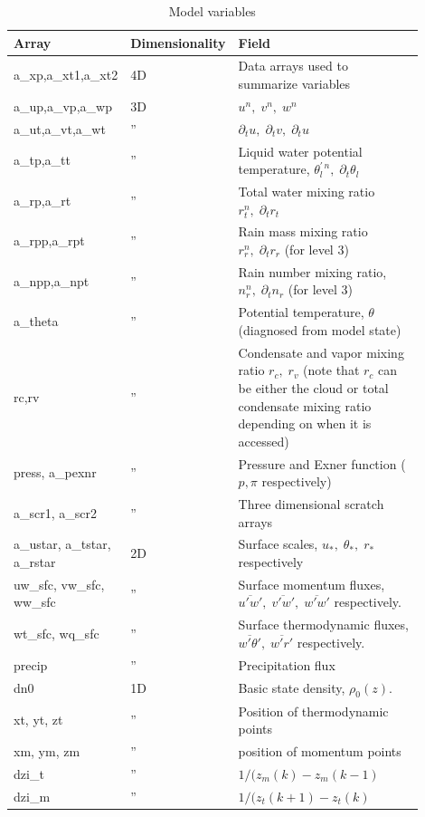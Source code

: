 \documentclass[11pt,a4paper]{article}
\begin{document}
\begin{longtable}[htb]{p{0.15\linewidth}p{0.15\linewidth}p{0.6\linewidth}}
\caption{Model variables} \label{tbl:variables}
\\ \hline \hline 
Array    & Dimensionality & Field \\ \hline \endhead
a\_xp,a\_xt1,a\_xt2 & 4D    & Data arrays used to summarize variables\\
a\_up,a\_vp,a\_wp & 3D    & $u^n, \; v^n, \;w^n$ \\
a\_ut,a\_vt,a\_wt & ''    & $\partial_t u, \; \partial_t v, 
\; \partial_t u$ \\  
a\_tp,a\_tt  & ''         & Liquid water potential temperature,
$\theta_l^{'\, n}, \;  \partial_t \theta_l$ \\ 
a\_rp,a\_rt  & ''         & Total water mixing ratio $r_t^n, \;
\partial_t r_t$ \\ 
a\_rpp,a\_rpt  & ''       & Rain mass mixing ratio $r_r^n, \;
\partial_t r_r$   (for level 3)\\  
a\_npp,a\_npt  & ''       & Rain number mixing ratio, $n_r^n, \;
\partial_t n_r$ (for level 3) \\  
a\_theta & '' & Potential temperature, $\theta$ (diagnosed from model state)\\  
rc,rv  & ''         & Condensate and vapor mixing ratio $r_c, \;
r_v$ (note that $r_c$ can be either the cloud or total condensate
mixing ratio depending on when it is accessed) \\ 
press, a\_pexnr & ''   & Pressure and Exner function ($p, \pi$ respectively)  \\  
a\_scr1, a\_scr2 & '' & Three dimensional scratch arrays \\
a\_ustar, a\_tstar, a\_rstar & 2D & Surface scales, $u_*, \;
\theta_*, \; r_*$ respectively \\ 
uw\_sfc, vw\_sfc, ww\_sfc & '' & Surface momentum fluxes,
$\overline{u'w'}, \;\overline{v'w'}, \;\overline{w'w'} $
respectively. \\  
wt\_sfc, wq\_sfc & '' & Surface thermodynamic fluxes,
$\overline{w'\theta'}, \;\overline{w'r'} $
respectively. \\
precip & '' &  Precipitation flux \\
dn0    & 1D &  Basic state density, $\rho_0(z).$ \\
xt, yt, zt & '' & Position of thermodynamic points \\
xm, ym, zm & '' & position of momentum points \\
dzi\_t        & '' & $1/(z_m(k) - z_m(k-1)$ \\
dzi\_m        & '' & $1/(z_t(k+1) - z_t(k)$ \\
\hline \hline
\end{longtable}
\end{document}
